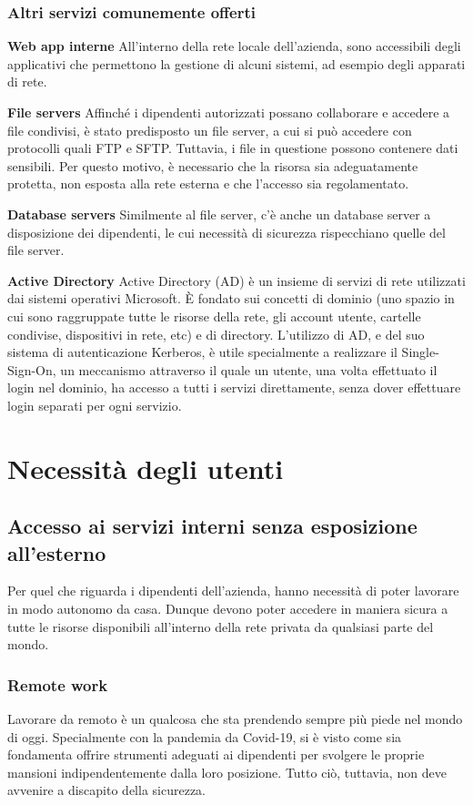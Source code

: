 \subsubsection{Altri servizi comunemente offerti}
\noindent \textbf{Web app interne}
All'interno della rete locale dell'azienda, sono accessibili degli applicativi che permettono la gestione di alcuni sistemi, ad esempio degli apparati di rete.

\noindent \textbf{File servers}
Affinché i dipendenti autorizzati possano collaborare e accedere a file condivisi, è stato predisposto un file server, a cui si può accedere con protocolli quali FTP \cite[RFC0791]{RFC0959} e SFTP. Tuttavia, i file in questione possono contenere dati sensibili. Per questo motivo, è necessario che la risorsa sia adeguatamente protetta, non esposta alla rete esterna e che l'accesso sia regolamentato.

\noindent \textbf{Database servers}
Similmente al file server, c'è anche un database server a disposizione dei dipendenti, le cui necessità di sicurezza rispecchiano quelle del file server.

\noindent \textbf{Active Directory}
Active Directory (AD) è un insieme di servizi di rete utilizzati dai sistemi operativi Microsoft. È fondato sui concetti di dominio (uno spazio in cui sono raggruppate tutte le risorse della rete, gli account utente, cartelle condivise, dispositivi in rete, etc) e di directory.
L'utilizzo di AD, e del suo sistema di autenticazione Kerberos, è utile specialmente a realizzare il Single-Sign-On, un meccanismo attraverso il quale un utente, una volta effettuato il login nel dominio, ha accesso a tutti i servizi direttamente, senza dover effettuare login separati per ogni servizio.

\section{Necessità degli utenti}
\subsection{Accesso ai servizi interni senza esposizione all'esterno}
Per quel che riguarda i dipendenti dell'azienda, hanno necessità di poter lavorare in modo autonomo da casa. Dunque devono poter accedere in maniera sicura a tutte le risorse disponibili all'interno della rete privata da qualsiasi parte del mondo.
\subsubsection{Remote work}
Lavorare da remoto è un qualcosa che sta prendendo sempre più piede nel mondo di oggi. Specialmente con la pandemia da Covid-19, si è visto come sia fondamenta offrire strumenti adeguati ai dipendenti per svolgere le proprie mansioni indipendentemente dalla loro posizione.
Tutto ciò, tuttavia, non deve avvenire a discapito della sicurezza.

